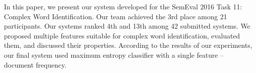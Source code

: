 In this paper, we present our system developed for the SemEval 2016 Task 11: Complex Word Identification. Our team achieved the 3rd place among 21 participants. Our systems ranked 4th and 13th among 42 submitted systems. We proposed multiple features suitable for complex word identification, evaluated them, and discussed their properties. According to the results of our experiments, our final system used maximum entropy classifier with a single feature -- document frequency.
